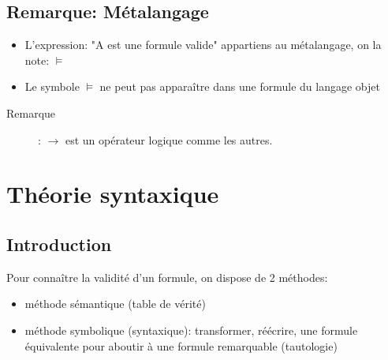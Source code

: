 \documentclass[10pt,a4paper]{article}
\begin{document}
	\subsection{Remarque: Métalangage}
		\begin{itemize}
			\item L'expression: "A est une formule valide" appartiens au métalangage, on la note: $\vDash$
			\item Le symbole $\vDash$ ne peut pas apparaître dans une formule du langage objet
		\end{itemize}
		\begin{description}
			\item[Remarque]: $\rightarrow$ est un opérateur logique comme les autres.
		\end{description}
\section{Théorie syntaxique}
	\subsection{Introduction}
		Pour connaître la validité d'un formule, on dispose de 2 méthodes:
		\begin{itemize}
			\item méthode sémantique (table de vérité)
			\item méthode symbolique (syntaxique): transformer, réécrire, une formule équivalente pour aboutir à une formule remarquable (tautologie)
		\end{itemize}			
\end{document}
